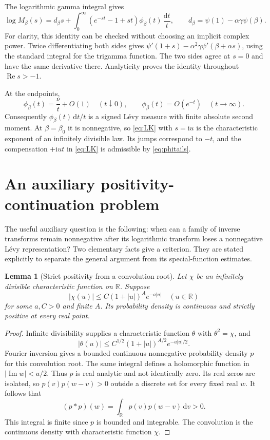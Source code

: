 \documentclass[11pt,a4paper]{article}
\numberwithin{equation}{section}
\newtheorem{lemma}[theorem]{Lemma}
\theoremstyle{definition}\newtheorem{definition}[theorem]{Definition}
\theoremstyle{remark}\newtheorem{remark}[theorem]{Remark}
\newcommand{\R}{\mathbb R}
\newcommand{\ii}{\mathrm i}
\newcommand{\dd}{\,\mathrm d}
\DeclareMathOperator{\Rea}{Re}
\DeclareMathOperator{\Ima}{Im}
\begin{document}
The logarithmic gamma integral gives
\begin{equation}\label{eq:LK}
 \log M_\beta(s)
 =d_\beta s+\int_0^\infty
 (e^{-st}-1+st)\phi_\beta(t)\,\frac{\mathrm dt}{t},
 \qquad d_\beta=\psi(1)-\alpha\gamma\psi(\beta).
\end{equation}
For clarity, this identity can be checked without choosing an implicit
complex power. Twice differentiating both sides gives
\(\psi'(1+s)-\alpha^2\gamma\psi'(\beta+\alpha s)\), using the
standard integral for the trigamma function. The two sides agree at
\(s=0\) and have the same derivative there. Analyticity proves the
identity throughout \(\Rea s>-1\).

At the endpoints,
\begin{equation}\label{eq:phitails}
 \phi_\beta(t)=\frac\nu t+O(1)\quad(t\downarrow0),\qquad
 \phi_\beta(t)=O(e^{-t})\quad(t\to\infty).
\end{equation}
Consequently \(\phi_\beta(t)\,\mathrm dt/t\) is a signed L\'evy
measure with finite absolute second moment. At \(\beta=\beta_0\)
it is nonnegative, so \eqref{eq:LK} with \(s=\ii u\) is the
characteristic exponent of an infinitely divisible law. Its jumps
correspond to \(-t\), and the compensation \(+\ii ut\) in
\eqref{eq:LK} is admissible by \eqref{eq:phitails}.

\section{An auxiliary positivity-continuation problem}

The useful auxiliary question is the following: when can a family of
inverse transforms remain nonnegative after its logarithmic transform
loses a nonnegative L\'evy representation? Two elementary facts give a
criterion. They are stated explicitly to separate the general argument
from its special-function estimates.

\begin{lemma}[Strict positivity from a convolution root]\label{lem:analyticID}
Let \(\chi\) be an infinitely divisible characteristic function on
\(\R\). Suppose
\[
 |\chi(u)|\le C(1+|u|)^A e^{-a|u|}\quad(u\in\R)
\]
for some \(a,C>0\) and finite \(A\). Its probability density is
continuous and strictly positive at every real point.
\end{lemma}
\begin{proof}
Infinite divisibility supplies a characteristic function \(\theta\)
with \(\theta^2=\chi\), and
\[
 |\theta(u)|\le C^{1/2}(1+|u|)^{A/2}e^{-a|u|/2}.
\]
Fourier inversion gives a bounded continuous nonnegative probability
density \(p\) for this convolution root. The same integral defines a
holomorphic function in \(|\Ima w|<a/2\). Thus \(p\) is real
analytic and not identically zero. Its real zeros are isolated, so
\(p(v)p(w-v)>0\) outside a discrete set for every fixed real \(w\).
It follows that
\[
 (p*p)(w)=\int_\R p(v)p(w-v)\dd v>0.
\]
This integral is finite since \(p\) is bounded and integrable. The
convolution is the continuous density with characteristic function
\(\chi\).
\end{proof}
\end{document}
